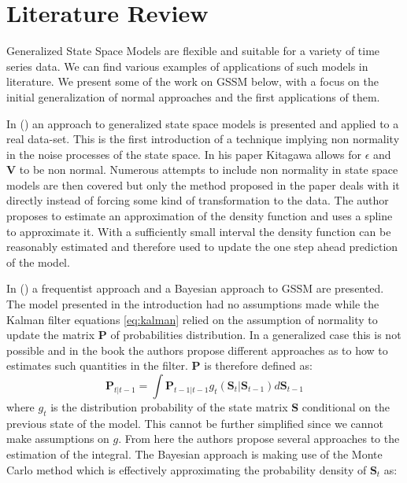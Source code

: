 \section{Literature Review}
\justify
Generalized State Space Models are flexible and suitable for a variety of time series data. We can find various examples of applications of such models in literature. We present some of the work on GSSM below, with a focus on the initial generalization of normal approaches and the first applications of them.
\par \vspace{5mm}
In (\cite{kitagawa1987}) an approach to generalized state space models is presented and applied to a real data-set. This is the first introduction of a technique implying non normality in the noise processes of the state space. In his paper Kitagawa allows for $\epsilon$ and \textbf{V} to be non normal. Numerous attempts to include non normality in state space models are then covered but only the method proposed in the paper deals with it directly instead of forcing some kind of transformation to the data. The author proposes to estimate an approximation of the density function and uses a spline to approximate it. With a sufficiently small interval the density function can be reasonably estimated and therefore used to update the one step ahead prediction of the model.
\par \vspace{5mm}
In (\cite{song2007correlated}) a frequentist approach and a Bayesian approach to GSSM are presented. The model presented in the introduction had no assumptions made while the Kalman filter equations \eqref{eq:kalman} relied on the assumption of normality to update the matrix \textbf{P} of probabilities distribution. In a generalized case this is not possible and in the book the authors propose different approaches as to how to estimates such quantities in the filter. \textbf{P} is therefore defined as:
\begin{equation}
    \label{eq:distprob}
    \textbf{P}_{t|t-1} = \int{\textbf{P}_{t-1|t-1}g_t(\textbf{S}_t|\textbf{S}_{t-1})
    d\textbf{S}_{t-1}}
\end{equation}
where $g_t$ is the distribution probability of the state matrix \textbf{S} conditional on the previous state of the model. This cannot be further simplified since we cannot make assumptions on $g$. From here the authors propose several approaches to the estimation of the integral. The Bayesian approach is making use of the Monte Carlo method which is effectively approximating the probability density of $\textbf{S}_t$ as:
